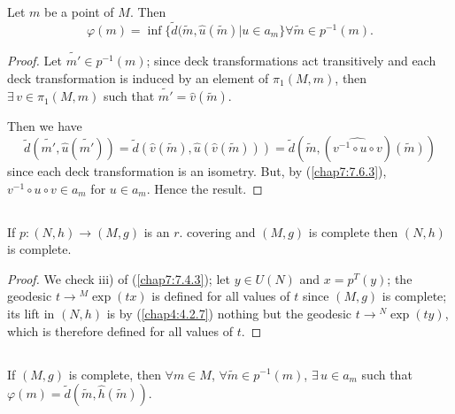 \begin{lemma*}
Let $m$ be a point of $M$. Then
$$
\varphi(m)=\inf\{\widetilde{d}(\widetilde{m},\widehat{u}(\widetilde{m})|u\in
a_{m}\}\forall \widetilde{m}\in p^{-1}(m).
$$
\end{lemma*}

\begin{proof}
Let $\widetilde{m'}\in p^{-1}(m)$; since deck transformations act
transitively and each deck transformation is induced by an element of
$\pi_{1}(M,m)$, then $\exists\, v\in\pi_{1}(M,m)$ such that
$\widetilde{m'}=\widehat{v}(\widetilde{m})$.

Then we have
$$
\widetilde{d}(\widetilde{m'},\widehat{u}(\widetilde{m'}))=\widetilde{d}(\widehat{v}(\widetilde{m}),\widehat{u}(\widehat{v}(\widetilde{m})))=\widetilde{d}(\widetilde{m},(\widehat{v^{-1}\circ
  u\circ v})(\widetilde{m})) 
$$
since each deck transformation is an isometry. But, by (\ref{chap7:7.6.3}),
$v^{-1}\circ u\circ v\in a_{m}$ for $u\in a_{m}$. Hence the result.
\end{proof}

\subsection{}\label{chap7:7.6.7}

\begin{lemma*}
If $p:(N,h)\to (M,g)$ is an $r$. covering and $(M,g)$ is complete then
$(N,h)$ is complete.
\end{lemma*}

\begin{proof}
We check iii) of (\ref{chap7:7.4.3}); let $y\in U(N)$ and $x=p^{T}(y)$;
the geodesic $t\to{}^{M}\exp(tx)$ is defined for all values of $t$
since $(M,g)$ is complete; its lift in $(N,h)$ is by (\ref{chap4:4.2.7})
nothing but the geodesic $t\to {}^{N}\exp(ty)$, which is therefore
defined for all values of $t$. 
\end{proof}

\subsection{}\label{chap7:7.6.8}

\begin{lemma*}
If $(M,g)$ is complete, then $\forall m\in M$,
$\forall\widetilde{m}\in p^{-1}(m)$, $\exists\, u\in a_{m}$ such that
$\varphi(m)=\widetilde{d}(\widetilde{m},\widehat{h}(\widetilde{m}))$. 
\end{lemma*}

